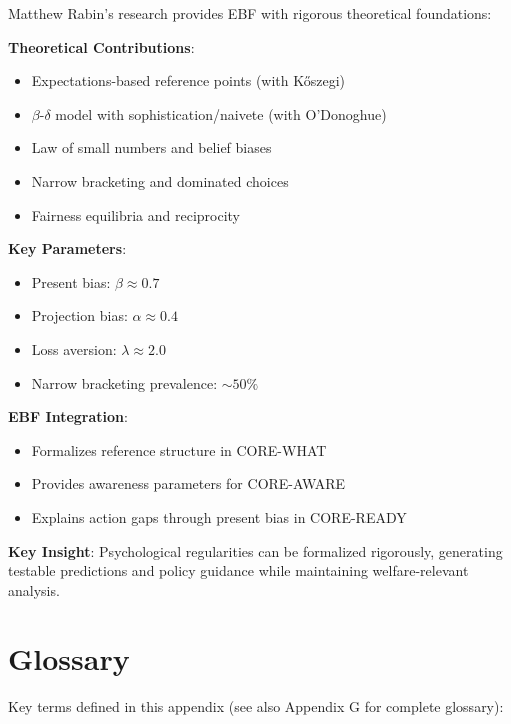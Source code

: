 \begin{tcolorbox}[colback=gray!5!white,colframe=gray!75!black,title=Chapter Summary]
Matthew Rabin's research provides EBF with rigorous theoretical foundations:

\textbf{Theoretical Contributions}:
\begin{itemize}
    \item Expectations-based reference points (with Kőszegi)
    \item $\beta$-$\delta$ model with sophistication/naivete (with O'Donoghue)
    \item Law of small numbers and belief biases
    \item Narrow bracketing and dominated choices
    \item Fairness equilibria and reciprocity
\end{itemize}

\textbf{Key Parameters}:
\begin{itemize}
    \item Present bias: $\beta \approx 0.7$
    \item Projection bias: $\alpha \approx 0.4$
    \item Loss aversion: $\lambda \approx 2.0$
    \item Narrow bracketing prevalence: $\sim 50\%$
\end{itemize}

\textbf{EBF Integration}:
\begin{itemize}
    \item Formalizes reference structure in CORE-WHAT
    \item Provides awareness parameters for CORE-AWARE
    \item Explains action gaps through present bias in CORE-READY
\end{itemize}

\textbf{Key Insight}: Psychological regularities can be formalized rigorously, generating testable predictions and policy guidance while maintaining welfare-relevant analysis.
\end{tcolorbox}

\section{Glossary}

Key terms defined in this appendix (see also Appendix G for complete glossary):

